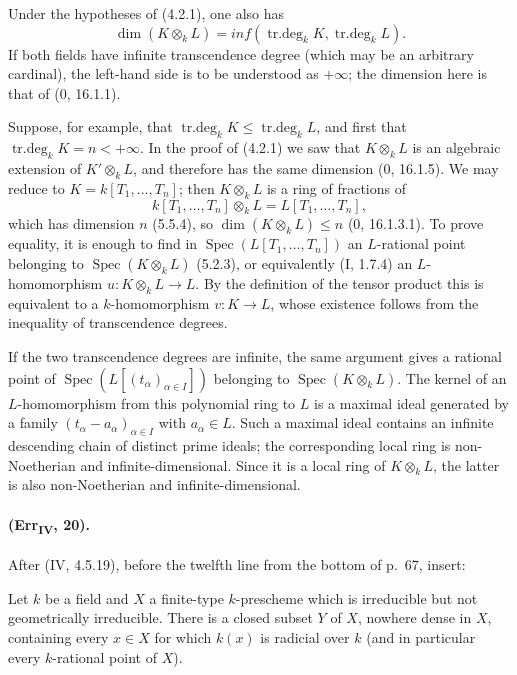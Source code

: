 \begin{remark}[4.2.1.4]
Under the hypotheses of (4.2.1), one also has
\begin{equation}
 \dim(K\otimes_kL)=inf(\operatorname{tr.deg}_kK,
                           \operatorname{tr.deg}_kL). \tag{4.2.1.5}
\end{equation}
If both fields have infinite transcendence degree (which may be an
arbitrary cardinal), the left-hand side is to be understood as
$+\infty$; the dimension here is that of ($0$, 16.1.1).

Suppose, for example, that
$\operatorname{tr.deg}_kK\leq\operatorname{tr.deg}_kL$, and first that
$\operatorname{tr.deg}_kK=n<+\infty$.  In the proof of (4.2.1) we saw
that $K\otimes_kL$ is an algebraic extension of $K'\otimes_kL$, and
therefore has the same dimension ($0$, 16.1.5).  We may reduce to
$K=k[T_1,\ldots,T_n]$; then $K\otimes_kL$ is a ring of fractions of
\[
 k[T_1,\ldots,T_n]\otimes_kL=L[T_1,\ldots,T_n],
\]
which has dimension $n$ (5.5.4), so
$\dim(K\otimes_kL)\leq n$ ($0$, 16.1.3.1).  To prove equality, it is
enough to find in $\operatorname{Spec}(L[T_1,\ldots,T_n])$ an
$L$-rational point belonging to $\operatorname{Spec}(K\otimes_kL)$
(5.2.3), or equivalently (I, 1.7.4) an $L$-homomorphism
$u:K\otimes_kL\to L$.  By the definition of the tensor product this is
equivalent to a $k$-homomorphism $v:K\to L$, whose existence follows
from the inequality of transcendence degrees.

If the two transcendence degrees are infinite, the same argument gives
a rational point of $\operatorname{Spec}(L[(t_\alpha)_{\alpha\in I}])$
belonging to $\operatorname{Spec}(K\otimes_kL)$.  The kernel of an
$L$-homomorphism from this polynomial ring to $L$ is a maximal ideal
generated by a family $(t_\alpha-a_\alpha)_{\alpha\in I}$ with
$a_\alpha\in L$.  Such a maximal ideal contains an infinite descending
chain of distinct prime ideals; the corresponding local ring is
non-Noetherian and infinite-dimensional.  Since it is a local ring of
$K\otimes_kL$, the latter is also non-Noetherian and
infinite-dimensional.
\end{remark}

\paragraph{(Err\textsubscript{IV}, 20).}
After (IV, 4.5.19), before the twelfth line from the bottom of p.~67,
insert:

\begin{corollary}[4.5.19.3]
Let $k$ be a field and $X$ a finite-type $k$-prescheme which is
irreducible but not geometrically irreducible.  There is a closed subset
$Y$ of $X$, nowhere dense in $X$, containing every $x\in X$ for which
$k(x)$ is radicial over $k$ (and in particular every $k$-rational point
of $X$).
\end{corollary}

